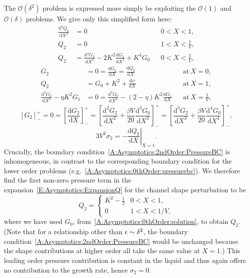 \documentclass{jfm}
\newcommand{\dd}[2]{\frac{\mathrm{d} #1}{\mathrm{d} #2}}
\newcommand{\poisson}{\eta} %
\begin{document}
The  $\mathcal{O}(\delta^2)$ problem is expressed more simply be exploiting the $\mathcal{O}(1)$ and $\mathcal{O}(\delta)$ problems. We give only this simplified form here:
\begin{align}
 \dd{^2 Q_2}{X^2}&=0 & &0 < X<1,\\
Q_2 &= 0 & &1 < X< \frac{1}{V},\\
Q_2 &= \dd{^4 G_2}{X^4} - 2K^2\dd{G_1}{X^2}+ K^4 G_0 & & 0 < X < \frac{1}{V},
\end{align}
\begin{align}
G_2 &= 0 = \dd{G_2}{X}= \dd{Q_2}{X} & &\text{at}~X = 0,\\
Q_2 &=G_0+ K^2+ \dd{\psi}{X} & &\text{at}~X = 1,\label{A:Asymptotics:2ndOrder:PressureBC}\\
\dd{^2 G_2}{X^2} - \poisson K^2 G_1 &=0 = \dd{^3 G_0}{X^3}  - (2- \poisson)K^2 \dd{G_1}{X}& &\text{at}~X = \frac{1}{V},
\end{align}
\begin{equation}
\left[G_2\right]_-^+ =0 = \left[\dd{G_2}{X}\right]_-^+ = \left[\dd{^2 G_2}{X^2} + \frac{\beta V}{20}\dd{^3G_0}{X^3}\right]_-^+ = \left[\dd{^3 G_2}{X^3} + \frac{\beta V}{20}\dd{^4 G_0}{X^4}\right]_-^+,
\end{equation}
\begin{equation}
3V^2 \sigma_2 = -\left.\dd{Q_2}{X}\right|_{X=1}.
\end{equation}
Crucially, the boundary condition~\eqref{A:Asymptotics:2ndOrder:PressureBC} is inhomogeneous, in contrast to the corresponding boundary condition for the lower order problems (e.g.~\eqref{A:Asymptotics:0thOrder:pressurebc}). We therefore find the first non-zero pressure term in the expansion~\eqref{E:Asymptotics:ExpansionQ} for the channel shape perturbation to be
\begin{equation}\label{A:Asymptotics:2ndOrder:solQ2}
Q_2 = \begin{cases}
K^2 - \frac{1}{2} & 0 <X  < 1,\\
0 & 1 < X < 1/V,
\end{cases}
\end{equation}
where we have used $G_0$, from~\eqref{A:Asymptotics:0thOrder:solution}, to obtain $Q_2$. (Note that for a relationship other than $\epsilon\sim \delta^2$, the boundary condition~\eqref{A:Asymptotics:2ndOrder:PressureBC} would be unchanged because the shape contributions at higher order all take the same value at $ X= 1$.) This leading order pressure contribution is constant in the liquid and thus again offers no contribution to the growth rate, hence $\sigma_2 = 0$.
\end{document}
